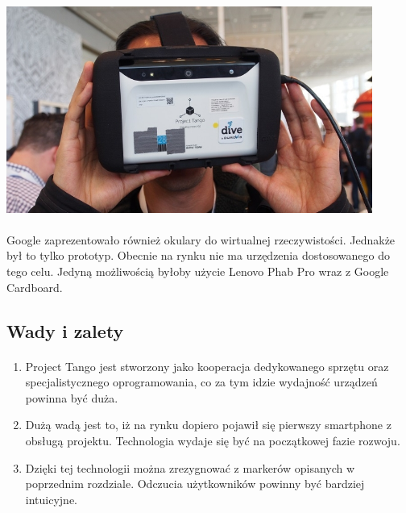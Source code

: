 \begin{center}
\includegraphics[width=0.9\textwidth]{images/tango.jpg}
\end{center}

\paragraph{}
Google zaprezentowało również okulary do wirtualnej rzeczywistości. Jednakże był to tylko prototyp. Obecnie na rynku nie ma urzędzenia dostosowanego do tego celu. Jedyną możliwością byłoby użycie Lenovo Phab Pro wraz z Google Cardboard.

\subsection{Wady i zalety}
\paragraph{}
\begin{enumerate}
	\item Project Tango jest stworzony jako kooperacja dedykowanego sprzętu oraz specjalistycznego oprogramowania, co za tym idzie wydajność urządzeń powinna być duża.
	\item Dużą wadą jest to, iż na rynku dopiero pojawił się pierwszy smartphone z obsługą projektu. Technologia wydaje się być na początkowej fazie rozwoju.
	\item Dzięki tej technologii można zrezygnować z markerów opisanych w poprzednim rozdziale. Odczucia użytkowników powinny być bardziej intuicyjne.
\end{enumerate}